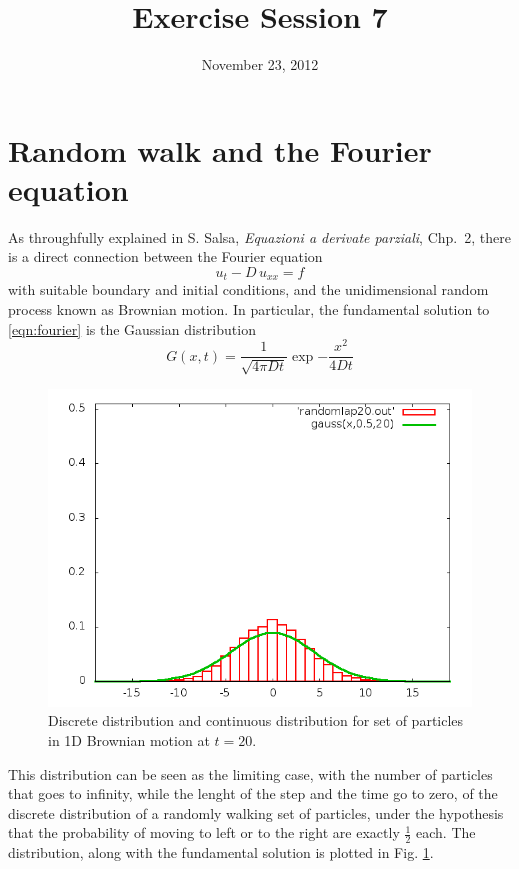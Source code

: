 \documentclass[10pt,a4paper]{article}
\title{Exercise Session 7}
\date{November 23, 2012}
\begin{document}
\lstset{language=[ISO]C++}
\maketitle

\section*{Random walk and the Fourier equation}

As throughfully explained in S. Salsa, \emph{Equazioni a derivate parziali},
Chp.~2, there is a direct connection between the Fourier equation
\begin{equation}
\label{eqn:fourier}
u_t - D \, u_{xx} = f
\end{equation}
with suitable boundary and initial conditions, and the unidimensional random
process known as Brownian motion. In particular, the fundamental solution to
\eqref{eqn:fourier} is the Gaussian distribution
\[
G(x,t) = \frac{1}{\sqrt{ 4 \pi D t}} \exp{-\frac{x^2}{4 D t}}
\]
%
\begin{figure}
\centering
\includegraphics[width=.6\textwidth]{fig/randomlap20}
\caption{Discrete distribution and continuous distribution for set of particles
         in 1D Brownian motion at $t = 20$.}
\label{fig:distr}
\end{figure}
%
This distribution can be seen as the limiting case, with the number of particles
that goes to infinity, while the lenght of the step and the time go to zero, of
the discrete distribution of a randomly walking set of particles, under the
hypothesis that the probability of moving to left or to the right are exactly
$\frac{1}{2}$ each. The distribution, along with the fundamental solution is
plotted in Fig. \ref{fig:distr}.





\end{document}

